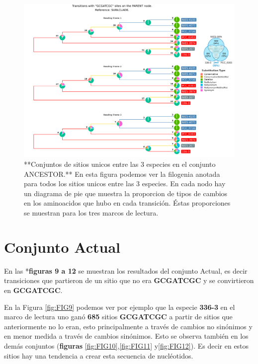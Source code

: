 \documentclass[
]{book}
\begin{document}
\begin{figure}

{\centering \includegraphics[width=1.2\linewidth]{Clados/Calothrix_B/figures/A/GCGATCGC/Ancestor/SUBCLADE_Ancestor_A_tree} 

}

\caption{**Conjuntos de sitios unicos entre las 3 especies en el conjunto ANCESTOR.** En esta figura podemos ver la filogenia anotada para todos los sitios unicos entre las 3 especies. En cada nodo hay un diagrama de pie que muestra la proporcion de tipos de cambios en los aminoacidos que hubo en cada transición. Éstas proporciones se muestran para los tres marcos de lectura.}\label{fig:FIG8}
\end{figure}

\hypertarget{conjunto-actual}{%
\section{Conjunto Actual}\label{conjunto-actual}}

En las *\textbf{figuras 9 a 12} se muestran los resultados del conjunto Actual, es decir transiciones que partieron de un sitio que no era \textbf{GCGATCGC} y se convirtieron en \textbf{GCGATCGC}.

En la Figura \ref{fig:FIG9} podemos ver por ejemplo que la especie \textbf{336-3} en el marco de lectura uno ganó \textbf{685} sitios \textbf{GCGATCGC} a partir de sitios que anteriormente no lo eran, esto principalmente a través de cambios no sinónimos y en menor medida a través de cambios sinónimos. Esto se observa también en los demás conjuntos (\textbf{figuras} \ref{fig:FIG10},\ref{fig:FIG11} y\ref{fig:FIG12}). Es decir en estos sitios hay una tendencia a crear esta secuencia de nucléotidos.
\end{document}
